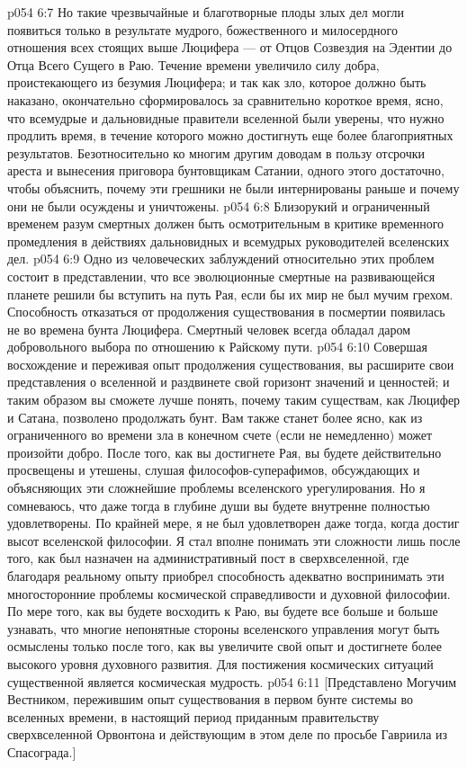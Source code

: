 \vs p054 6:7 Но такие чрезвычайные и благотворные плоды злых дел могли появиться только в результате мудрого, божественного и милосердного отношения всех стоящих выше Люцифера --- от Отцов Созвездия на Эдентии до Отца Всего Сущего в Раю. Течение времени увеличило силу добра, проистекающего из безумия Люцифера; и так как зло, которое должно быть наказано, окончательно сформировалось за сравнительно короткое время, ясно, что всемудрые и дальновидные правители вселенной были уверены, что нужно продлить время, в течение которого можно достигнуть еще более благоприятных результатов. Безотносительно ко многим другим доводам в пользу отсрочки ареста и вынесения приговора бунтовщикам Сатании, одного этого достаточно, чтобы объяснить, почему эти грешники не были интернированы раньше и почему они не были осуждены и уничтожены.
\vs p054 6:8 Близорукий и ограниченный временем разум смертных должен быть осмотрительным в критике временного промедления в действиях дальновидных и всемудрых руководителей вселенских дел.
\vs p054 6:9 Одно из человеческих заблуждений относительно этих проблем состоит в представлении, что все эволюционные смертные на развивающейся планете решили бы вступить на путь Рая, если бы их мир не был мучим грехом. Способность отказаться от продолжения существования в посмертии появилась не во времена бунта Люцифера. Смертный человек всегда обладал даром добровольного выбора по отношению к Райскому пути.
\vs p054 6:10 \pc Совершая восхождение и переживая опыт продолжения существования, вы расширите свои представления о вселенной и раздвинете свой горизонт значений и ценностей; и таким образом вы сможете лучше понять, почему таким существам, как Люцифер и Сатана, позволено продолжать бунт. Вам также станет более ясно, как из ограниченного во времени зла в конечном счете (если не немедленно) может произойти добро. После того, как вы достигнете Рая, вы будете действительно просвещены и утешены, слушая философов\hyp{}суперафимов, обсуждающих и объясняющих эти сложнейшие проблемы вселенского урегулирования. Но я сомневаюсь, что даже тогда в глубине души вы будете внутренне полностью удовлетворены. По крайней мере, я не был удовлетворен даже тогда, когда достиг высот вселенской философии. Я стал вполне понимать эти сложности лишь после того, как был назначен на административный пост в сверхвселенной, где благодаря реальному опыту приобрел способность адекватно воспринимать эти многосторонние проблемы космической справедливости и духовной философии. По мере того, как вы будете восходить к Раю, вы будете все больше и больше узнавать, что многие непонятные стороны вселенского управления могут быть осмыслены только после того, как вы увеличите свой опыт и достигнете более высокого уровня духовного развития. Для постижения космических ситуаций существенной является космическая мудрость.
\vsetoff
\vs p054 6:11 [Представлено Могучим Вестником, пережившим опыт существования в первом бунте системы во вселенных времени, в настоящий период приданным правительству сверхвселенной Орвонтона и действующим в этом деле по просьбе Гавриила из Спасограда.]
